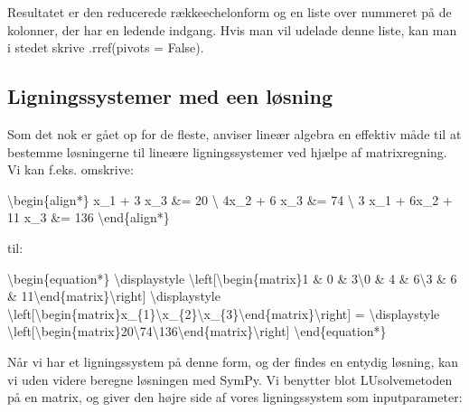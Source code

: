 \documentclass[letterpaper,10pt,english]{jupyterBook}
\begin{document}
Resultatet er den reducerede række\sphinxhyphen{}echelonform og en liste over nummeret på de kolonner, der har en ledende indgang. Hvis man vil udelade denne liste, kan man i stedet skrive .rref(pivots = False).


\subsection{Ligningssystemer med een løsning}
\label{\detokenize{notebooks/sympy/Notebook_LinAlg1:ligningssystemer-med-een-losning}}
Som det nok er gået op for de fleste, anviser lineær algebra en effektiv måde til at bestemme løsningerne til lineære ligningssystemer ved hjælpe af matrixregning. Vi kan f.eks. omskrive:

\textbackslash{}begin\{align*\}
x\_1 + 3 x\_3 \&= 20 \textbackslash{} 4x\_2 + 6 x\_3 \&= 74 \textbackslash{} 3 x\_1 + 6x\_2 + 11 x\_3 \&= 136
\textbackslash{}end\{align*\}

til:

\textbackslash{}begin\{equation*\}
\textbackslash{}displaystyle \textbackslash{}left{[}\textbackslash{}begin\{matrix\}1 \& 0 \& 3\textbackslash{}0 \& 4 \& 6\textbackslash{}3 \& 6 \& 11\textbackslash{}end\{matrix\}\textbackslash{}right{]} \textbackslash{}displaystyle \textbackslash{}left{[}\textbackslash{}begin\{matrix\}x\_\{1\}\textbackslash{}x\_\{2\}\textbackslash{}x\_\{3\}\textbackslash{}end\{matrix\}\textbackslash{}right{]} = \textbackslash{}displaystyle \textbackslash{}left{[}\textbackslash{}begin\{matrix\}20\textbackslash{}74\textbackslash{}136\textbackslash{}end\{matrix\}\textbackslash{}right{]}
\textbackslash{}end\{equation*\}

Når vi har et ligningssystem på denne form, og der findes en entydig løsning, kan vi uden videre beregne løsningen med SymPy. Vi benytter blot LUsolve\sphinxhyphen{}metoden på en matrix, og giver den højre side af vores ligningssystem som inputparameter:

\begin{sphinxVerbatim}[commandchars=\\\{\}]
  \PYG{p}{[}\PYG{p}{[}  \PYG{p}{]} \PYG{p}{[}  \PYG{p}{]} \PYG{p}{[}  \PYG{p}{]}\PYG{p}{]}
  \PYG{p}{[}  \PYG{p}{]}

  
\end{sphinxVerbatim}
\end{document}
